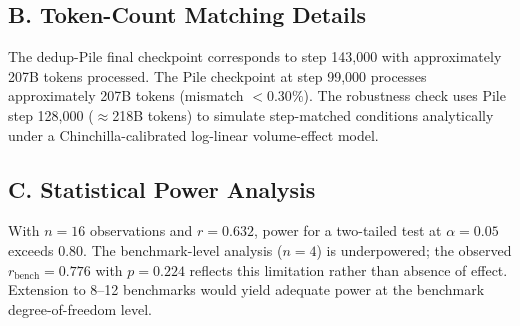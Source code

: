 \subsection*{B. Token-Count Matching Details}

The dedup-Pile final checkpoint corresponds to step 143,000 with approximately 207B tokens
processed. The Pile checkpoint at step 99,000 processes approximately 207B tokens
(mismatch $< 0.30\%$). The robustness check uses Pile step 128,000 ($\approx$218B tokens)
to simulate step-matched conditions analytically under a Chinchilla-calibrated log-linear
volume-effect model.

\subsection*{C. Statistical Power Analysis}

With $n = 16$ observations and $r = 0.632$, power for a two-tailed test at $\alpha = 0.05$
exceeds 0.80. The benchmark-level analysis ($n = 4$) is underpowered; the observed
$r_{\text{bench}} = 0.776$ with $p = 0.224$ reflects this limitation rather than
absence of effect. Extension to 8--12 benchmarks would yield adequate power at the
benchmark degree-of-freedom level.
